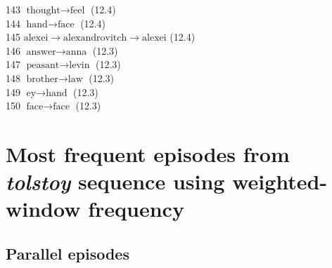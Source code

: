 \begin{appendices}
   143  $ \text{thought} \to \text{feel} $ (12.4) \\
   144  $ \text{hand} \to \text{face} $ (12.4) \\
   145  $ \text{alexei} \to \text{alexandrovitch} \to \text{alexei} $ (12.4) \\
   146  $ \text{answer} \to \text{anna} $ (12.3) \\
   147  $ \text{peasant} \to \text{levin} $ (12.3) \\
   148  $ \text{brother} \to \text{law} $ (12.3) \\
   149  $ \text{ey} \to \text{hand} $ (12.3) \\
   150  $ \text{face} \to \text{face} $ (12.3) \\
\fi

\iffalse
\chapter{Most frequent episodes from \emph{tolstoy} sequence using weighted-window frequency}

\section{Parallel episodes}


\end{appendices}
